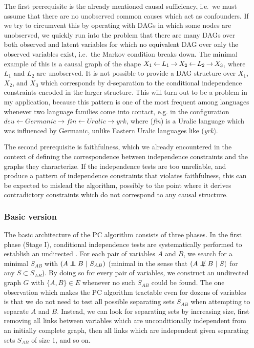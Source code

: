 The first prerequisite is the already mentioned causal sufficiency, i.e.\ we must assume that there are no unobserved common causes which act as confounders. If we try to circumvent this by operating with DAGs in which some nodes are unobserved, we quickly run into the problem that there are many DAGs over both observed and latent variables for which no equivalent DAG over only the observed variables exist, i.e.\ the Markov condition breaks down. The minimal example of this is a causal graph of the shape $X_1 \kern 2pt\hbox{$\leftarrow$}\kern 2pt L_1 \kern 2pt\hbox{$\rightarrow$}\kern 2pt X_2 \kern 2pt\hbox{$\leftarrow$}\kern 2pt L_2 \kern 2pt\hbox{$\rightarrow$}\kern 2pt X_3$, where $L_1$ and $L_2$ are unobserved. It is not possible to provide a DAG structure over $X_1$, $X_2$, and $X_3$ which corresponds by d-separation to the conditional independence constraints encoded in the larger structure. This will turn out to be a problem in my application, because this pattern is one of the most frequent among languages whenever two language families come into contact, e.g. in the configuration $deu \leftarrow Germanic \rightarrow fin \leftarrow Uralic \rightarrow yrk$, where  (\textit{fin}) is a Uralic language which was influenced by Germanic, unlike Eastern Uralic languages like  (\textit{yrk}).

The second prerequisite is faithfulness, which we already encountered in the context of defining the correspondence between independence constraints and the graphs they characterize. If the independence tests are too unreliable, and produce a pattern of independence constraints that violates faithfulness, this can be expected to mislead the algorithm, possibly to the point where it derives contradictory constraints which do not correspond to any causal structure.

\subsubsection{Basic version}
The basic architecture of the PC algorithm consists of three phases. In the first phase (Stage I), conditional independence tests are systematically performed to establish an undirected \textit{}. For each pair of variables $A$ and $B$, we search for a minimal \textit{} $S_{AB}$ with $(A \independent B\ |\ S_{AB})$ (minimal in the sense that $(A \notindep B\ |\ S)$ for any $S \subset S_{AB}$). By doing so for every pair of variables, we construct an undirected graph $G$ with $\{A,B\} \in E$ whenever no such $S_{AB}$ could be found. The one observation which makes the PC algorithm tractable even for dozens of variables is that we do not need to test all possible separating sets $S_{AB}$ when attempting to separate $A$ and $B$. Instead, we can look for separating sets by increasing size, first removing all links between variables which are unconditionally independent from an initially complete graph, then all links which are independent given separating sets $S_{AB}$ of size 1, and so on.

